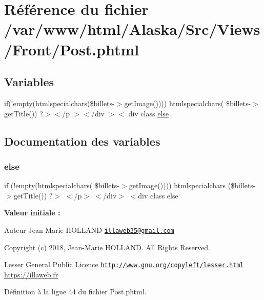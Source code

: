\hypertarget{_post_8phtml}{}\section{Référence du fichier /var/www/html/\+Alaska/\+Src/\+Views/\+Front/\+Post.phtml}
\label{_post_8phtml}
\subsection*{Variables}
\begin{DoxyCompactItemize}
\item 
if(!empty(htmlspecialchars(\$billets-\/$>$get\+Image()))) htmlspecialchars( \$billets-\/$>$get\+Title()) ?$>$$<$/p $>$$<$/div $>$$<$ div class \hyperlink{_post_8phtml_acc9a0c9a6a649164ac0aeb82c2c6640e}{else}
\end{DoxyCompactItemize}


\subsection{Documentation des variables}
\mbox{\label{_post_8phtml_acc9a0c9a6a649164ac0aeb82c2c6640e}} 
\subsubsection{\texorpdfstring{else}{else}}
{\footnotesize\ttfamily if (!empty(htmlspecialchars( \$billets-\/$>$get\+Image()))) htmlspecialchars (\$billets-\/$>$get\+Title()) ?$>$ $<$/p$>$ $<$/div$>$ $<$div class else}

{\bfseries Valeur initiale \+:}
\begin{DoxyAuthor}{Auteur}
Jean-\/\+Marie H\+O\+L\+L\+A\+ND \href{mailto:illaweb35@gmail.com}{\tt illaweb35@gmail.\+com} 
\end{DoxyAuthor}
\begin{DoxyCopyright}{Copyright}
(c) 2018, Jean-\/\+Marie H\+O\+L\+L\+A\+ND. All Rights Reserved.
\end{DoxyCopyright}
Lesser General Public Licence \href{http://www.gnu.org/copyleft/lesser.html}{\tt http\+://www.\+gnu.\+org/copyleft/lesser.\+html} \hyperlink{}{https\+://illaweb.\+fr}

Définition à la ligne 44 du fichier Post.\+phtml.

